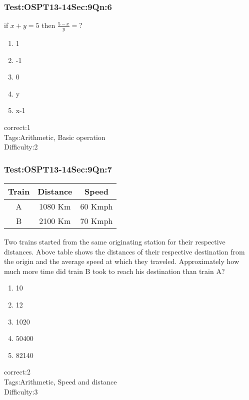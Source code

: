 \documentclass[]{beamer}
\begin{document}
    \begin{frame}
	    \frametitle{Test:OSPT13-14\hspace{2mm}Sec:9\hspace{2mm}Qn:6}
	    if $x+y=5$ then $\frac{5-x}{y}=?$
	   \begin{enumerate}
	        \item
	           1
	        \item
	            -1
	        \item
	           0
	        \item
	            y
	        \item
	           x-1
	    \end{enumerate}
	    correct:1\\   
	    Tags:Arithmetic, Basic operation \\
	    Difficulty:2   \\
    \end{frame}    
    \begin{frame}
	    \frametitle{Test:OSPT13-14\hspace{2mm}Sec:9\hspace{2mm}Qn:7}
	    \begin{tabular}{|c|c|c|}
	    \hline
	    Train & Distance & Speed\\
	    \hline
	    A & 1080 Km & 60 Kmph\\
	    \hline
	    B & 2100 Km & 70 Kmph\\
	    \hline	    
	    \end{tabular}
	    
	    Two trains started from the same originating station for their respective distances. Above table shows the distances of their respective destination from the origin and the average speed at which they traveled. Approximately how much more time did train B took to reach his destination than train A?
	   \begin{enumerate}
	        \item
	           10
	        \item
	            12
	        \item
	           1020
	        \item
	            50400
	        \item
	           82140
	    \end{enumerate}
	    correct:2\\   
	    Tags:Arithmetic, Speed and distance \\
	    Difficulty:3   \\
    \end{frame}    
\end{document}
